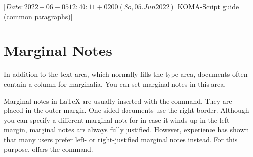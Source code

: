 %
%
%
%
%
%
%

                 [$Date: 2022-06-05 12:40:11 +0200 (So, 05. Jun 2022) $
                  KOMA-Script guide (common paragraphs)]

\section{Marginal Notes}
%
\BeginIndexGroup
{}%


In addition to the text area, which normally fills the type area, documents
often contain a column for marginalia. You can set marginal notes in this 
area.
%


\begin{Declaration}
\end{Declaration}%
Marginal notes in {\LaTeX} are usually
inserted with the  command. They are placed in the outer
margin. One-sided documents use the right border. Although you can specify a
different marginal note for  in case it winds up in the left
margin, marginal notes are always fully justified. However, experience has
shown that many users prefer left- or right-justified marginal notes
instead. For this purpose, {\KOMAScript} offers the 
command.

